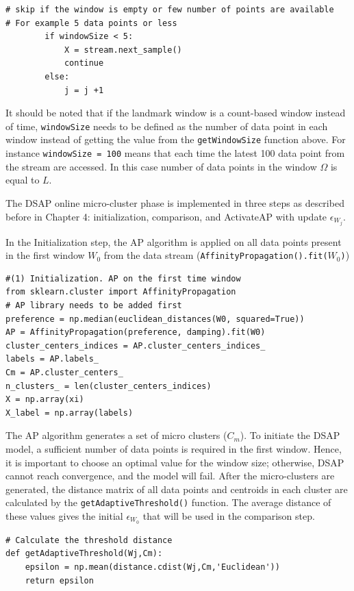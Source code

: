 \begin{lstlisting}
# skip if the window is empty or few number of points are available
# For example 5 data points or less 
        if windowSize < 5:
            X = stream.next_sample()
            continue
        else:    
            j = j +1
\end{lstlisting}


It should be noted that if the landmark window is a count-based window instead of time, \texttt{windowSize} needs to be defined as the number of data point in each window instead of getting the value from the \texttt{getWindowSize} function above. For instance \texttt{windowSize = 100} means that each time the latest 100 data point from the stream are accessed. In this case number of data points in the window $\Omega$ is equal to $L$.

The DSAP online micro-cluster phase is implemented in three steps as described before in Chapter 4: initialization, comparison, and ActivateAP with update $\epsilon_{W_j}$.

In the Initialization step, the AP algorithm is applied on all data points present in the first window $W_0$ from the data stream (\texttt{AffinityPropagation().fit($W_0$)})

\begin{lstlisting}
#(1) Initialization. AP on the first time window
from sklearn.cluster import AffinityPropagation 
# AP library needs to be added first
preference = np.median(euclidean_distances(W0, squared=True))
AP = AffinityPropagation(preference, damping).fit(W0)
cluster_centers_indices = AP.cluster_centers_indices_
labels = AP.labels_
Cm = AP.cluster_centers_
n_clusters_ = len(cluster_centers_indices)
X = np.array(xi)
X_label = np.array(labels)
\end{lstlisting}

The AP algorithm generates a set of micro clusters ($C{_m}$). To initiate the DSAP model, a sufficient number of data points is required in the first window. Hence, it is important to choose an optimal value for the window size; otherwise, DSAP cannot reach convergence, and the model will fail. After the micro-clusters are generated, the distance matrix of all data points and centroids in each cluster are calculated by the \texttt{getAdaptiveThreshold()} function. The average distance of these values gives the initial $\epsilon_{W_0}$ that will be used in the comparison step.


\begin{lstlisting}
# Calculate the threshold distance
def getAdaptiveThreshold(Wj,Cm):
    epsilon = np.mean(distance.cdist(Wj,Cm,'Euclidean'))
    return epsilon 
\end{lstlisting}

